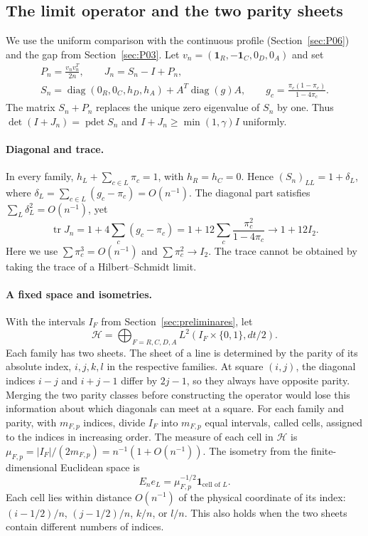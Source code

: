 \subsection{The limit operator and the two parity sheets}\label{sec:D03}
We use the uniform comparison with the continuous profile (Section~\ref{sec:P06}) and the gap from
Section~\ref{sec:P03}.
Let $v_n=(\mathbf1_R,-\mathbf1_C,0_D,0_A)$ and set
\[
 \begin{gathered}
 P_n=\frac{v_nv_n^T}{2n},\qquad J_n=S_n-I+P_n,\\
 S_n=\operatorname{diag}(0_R,0_C,h_D,h_A)+A^T\operatorname{diag}(g)A,
 \qquad g_c=\frac{\pi_c(1-\pi_c)}{1-4\pi_c}.
 \end{gathered}                                         \tag{D3.1}
\]
The matrix $S_n+P_n$ replaces the unique zero eigenvalue of $S_n$ by one.
Thus $\det(I+J_n)=\operatorname{pdet}S_n$ and
$I+J_n\ge\min(1,\gamma)I$ uniformly.

\paragraph{Diagonal and trace.}
In every family, $h_L+\sum_{c\in L}\pi_c=1$, with $h_R=h_C=0$.
Hence $(S_n)_{LL}=1+\delta_L$, where
$\delta_L=\sum_{c\in L}(g_c-\pi_c)=O(n^{-1})$.
The diagonal part satisfies $\sum_L\delta_L^2=O(n^{-1})$, yet
\[
 \operatorname{tr}J_n
 =1+4\sum_c(g_c-\pi_c)
 =1+12\sum_c\frac{\pi_c^2}{1-4\pi_c}
 \longrightarrow1+12I_2.                          \tag{D3.2}
\]
Here we use $\sum\pi_c^3=O(n^{-1})$ and $\sum\pi_c^2\to I_2$.
The trace cannot be obtained by taking the trace of a Hilbert--Schmidt limit.

\paragraph{A fixed space and isometries.}
With the intervals $I_F$ from Section~\ref{sec:preliminares}, let
\[
 \mathcal H=\bigoplus_{F=R,C,D,A}
          L^2(I_F\times\{0,1\},dt/2).
\]
Each family has two sheets. The sheet of a line is determined by the parity of its absolute index,
$i,j,k,l$ in the respective families. At square $(i,j)$, the diagonal indices $i-j$ and $i+j-1$
differ by $2j-1$, so they always have opposite parity. Merging the two parity
classes before constructing the operator would lose this information about which diagonals
can meet at a square.
For each family and parity, with $m_{F,p}$ indices, divide $I_F$
into $m_{F,p}$ equal intervals, called cells, assigned to the indices in increasing order.
The measure of each cell in $\mathcal H$ is
$\mu_{F,p}=|I_F|/(2m_{F,p})=n^{-1}(1+O(n^{-1}))$.
The isometry from the finite-dimensional Euclidean space is
\[
 E_ne_L=\mu_{F,p}^{-1/2}\mathbf1_{\text{cell of }L}.
                                                        \tag{D3.3}
\]
Each cell lies within distance $O(n^{-1})$ of the physical coordinate
of its index: $(i-1/2)/n$, $(j-1/2)/n$, $k/n$, or $l/n$.
This also holds when the two sheets contain different numbers of indices.

